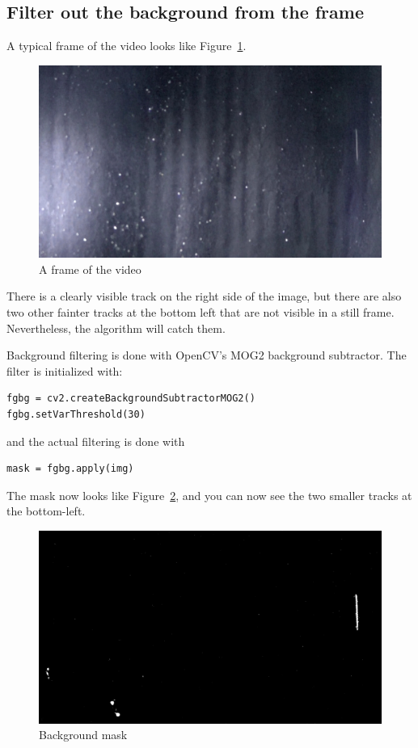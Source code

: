\documentclass[notitlepage]{article}
\begin{document}
\subsection{Filter out the background from the frame}

A typical frame of the video looks like Figure~\ref{fig:frame}.

\begin{figure}[h]
	\centering
	\includegraphics[width=.45\textwidth]{frame}
	\caption{A frame of the video\label{fig:frame}}
\end{figure}

There is a clearly visible track on the right side of the image, but there are also two other fainter tracks at the bottom left that are not visible in a still frame.  Nevertheless, the algorithm will catch them.

Background filtering is done with OpenCV's MOG2 background subtractor.  The filter is initialized with:
\begin{lstlisting}
fgbg = cv2.createBackgroundSubtractorMOG2()
fgbg.setVarThreshold(30)
\end{lstlisting}
and the actual filtering is done with 
\begin{lstlisting}
mask = fgbg.apply(img)
\end{lstlisting}

The mask now looks like Figure~\ref{fig:mask1}, and you can now see the two smaller tracks at the bottom-left.

\begin{figure}[h]
	\centering
	\includegraphics[width=.45\textwidth]{mask1}
	\caption{Background mask}
	\label{fig:mask1}
\end{figure}
\end{document}
